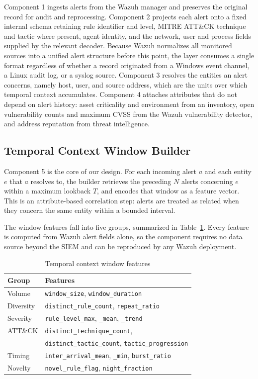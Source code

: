 \documentclass[conference]{IEEEtran}
\begin{document}
Component 1 ingests alerts from the Wazuh manager and preserves the original record for audit and reprocessing. Component 2 projects each alert onto a fixed internal schema retaining rule identifier and level, MITRE ATT\&CK technique and tactic where present, agent identity, and the network, user and process fields supplied by the relevant decoder. Because Wazuh normalizes all monitored sources into a unified alert structure before this point, the layer consumes a single format regardless of whether a record originated from a Windows event channel, a Linux audit log, or a syslog source. Component 3 resolves the entities an alert concerns, namely host, user, and source address, which are the units over which temporal context accumulates. Component 4 attaches attributes that do not depend on alert history: asset criticality and environment from an inventory, open vulnerability counts and maximum CVSS from the Wazuh vulnerability detector, and address reputation from threat intelligence.

\subsection{Temporal Context Window Builder}

Component 5 is the core of our design. For each incoming alert $a$ and each entity $e$ that $a$ resolves to, the builder retrieves the preceding $N$ alerts concerning $e$ within a maximum lookback $T$, and encodes that window as a feature vector. This is an attribute-based correlation step: alerts are treated as related when they concern the same entity within a bounded interval.

The window features fall into five groups, summarized in Table~\ref{tab:features}. Every feature is computed from Wazuh alert fields alone, so the component requires no data source beyond the SIEM and can be reproduced by any Wazuh deployment.

\begin{table}[t]
\caption{Temporal context window features}
\label{tab:features}
\centering
\footnotesize
\begin{tabular}{@{}ll@{}}
\toprule
\textbf{Group} & \textbf{Features} \\
\midrule
Volume & \texttt{window\_size}, \texttt{window\_duration} \\
Diversity & \texttt{distinct\_rule\_count}, \texttt{repeat\_ratio} \\
Severity & \texttt{rule\_level\_max}, \texttt{\_mean}, \texttt{\_trend} \\
ATT\&CK & \texttt{distinct\_technique\_count}, \\
        & \texttt{distinct\_tactic\_count}, \texttt{tactic\_progression} \\
Timing & \texttt{inter\_arrival\_mean}, \texttt{\_min}, \texttt{burst\_ratio} \\
Novelty & \texttt{novel\_rule\_flag}, \texttt{night\_fraction} \\
\bottomrule
\end{tabular}
\end{table}
\end{document}
